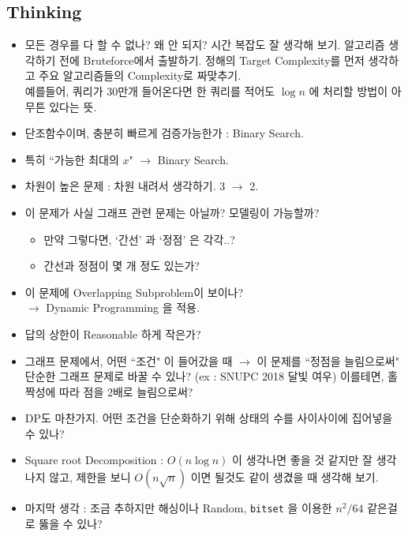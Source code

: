\documentclass[landscape,8pt]{article}
\begin{document}
\begin{multicols}{2}
  \subsection{Thinking}
    \begin{itemize}
      \item 모든 경우를 다 할 수 없나? 왜 안 되지? 시간 복잡도 잘 생각해 보기. 알고리즘 생각하기 전에 Bruteforce에서 출발하기. 정해의 Target Complexity를 먼저 생각하고 주요 알고리즘들의 Complexity로 짜맞추기.\\
      예를들어, 쿼리가 30만개 들어온다면 한 쿼리를 적어도 $\log{n}$ 에 처리할 방법이 아무튼 있다는 뜻.
      \item 단조함수이며, 충분히 빠르게 검증가능한가 : Binary Search.
      \item 특히 ``가능한 최대의 $x$" $\to$ Binary Search.
      \item 차원이 높은 문제 : 차원 내려서 생각하기. 3 $\rightarrow$ 2.
      \item 이 문제가 사실 그래프 관련 문제는 아닐까? 모델링이 가능할까?
          \begin{itemize}
            \item 만약 그렇다면, `간선' 과 `정점' 은 각각..?
            \item 간선과 정점이 몇 개 정도 있는가?
          \end{itemize}
      \item 이 문제에 Overlapping Subproblem이 보이나? \\$\rightarrow$ Dynamic Programming 을 적용.
      \item 답의 상한이 Reasonable 하게 작은가?
      \item 그래프 문제에서, 어떤 ``조건" 이 들어갔을 때 $\to$ 이 문제를 ``정점을 늘림으로써" 단순한 그래프 문제로 바꿀 수 있나? (ex : SNUPC 2018 달빛 여우) 이를테면, 홀짝성에 따라 점을 2배로 늘림으로써?
      \item DP도 마찬가지. 어떤 조건을 단순화하기 위해 상태의 수를 사이사이에 집어넣을 수 있나?
      \item Square root Decomposition : $O(n \log n)$ 이 생각나면 좋을 것 같지만 잘 생각나지 않고, 제한을 보니 $O(n \sqrt{n})$ 이면 될것도 같이 생겼을 때 생각해 보기.
      \item 마지막 생각 : 조금 추하지만 해싱이나 Random, \texttt{bitset} 을 이용한 $n^2 / 64$ 같은걸로 뚫을 수 있나?
    \end{itemize}
\newpage

\end{multicols}
\end{document}
